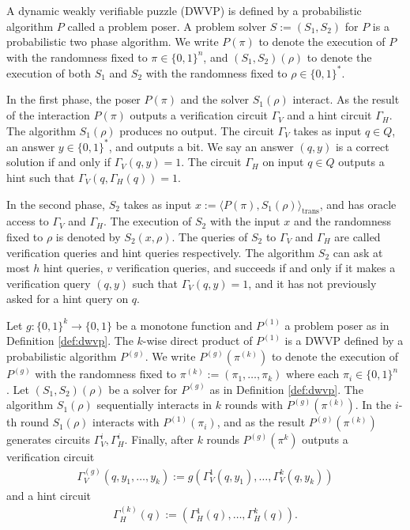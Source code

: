 %
\begin{definition}
  \label{def:dwvp}
  A dynamic weakly verifiable puzzle (DWVP) is defined by a probabilistic algorithm $P$
  called a problem poser.
  A problem solver $S := (S_1, S_2)$ for $P$ is a probabilistic two phase algorithm.
  We write $P(\pi)$ to denote the execution of $P$ with the randomness fixed to $\pi \in \{0,1\}^n$, and $(S_1,S_2)(\rho)$
  to denote the execution of both $S_1$ and $S_2$ with the randomness fixed to $\rho \in \{0,1\}^{*}$.

  In the first phase, the poser $P(\pi)$ and the solver $S_1(\rho)$ interact.
  As the result of the interaction $P(\pi)$ outputs a verification circuit $\Gamma_{V}$ and a hint circuit $\Gamma_{H}$.
  The algorithm $S_1(\rho)$ produces no output.
  The circuit $\Gamma_{V}$ takes as input $q \in Q$, an answer $y \in \{0,1\}^*$,
  and outputs a bit. We say an answer $(q,y)$ is a correct solution if and only if $\Gamma_V(q,y) = 1$.
  The circuit $\Gamma_H$ on input $q \in Q$ outputs a hint such that $\Gamma_V(q,\Gamma_H(q)) = 1$.

  In the second phase, $S_2$ takes as input $x := \langle P(\pi), S_1(\rho) \rangle_{\text{trans}}$,
  and has oracle access to $\Gamma_V$ and $\Gamma_H$.
  The execution of $S_2$ with the input $x$ and the randomness fixed to $\rho$
  is denoted by $S_2(x, \rho)$. The queries of $S_2$ to $\Gamma_V$ and $\Gamma_H$ are called verification queries and hint queries respectively.
  The algorithm $S_2$ can ask at most $h$ hint queries, $v$ verification queries, and succeeds if and only if
  it makes a verification query $(q,y)$ such that $\Gamma_V(q,y) = 1$, and it has not previously asked for a hint query on $q$.
\end{definition}
%
\begin{definition}
  Let $g: \{0,1\}^{k} \rightarrow \{0,1\}$ be a monotone function and $P^{(1)}$ a problem poser as in Definition \ref{def:dwvp}.
  The $k$-wise direct product of $P^{(1)}$ is a DWVP defined by a probabilistic algorithm $P^{(g)}$.
  We write $P^{(g)}(\pi^{(k)})$ to denote the execution of $P^{(g)}$ with the randomness fixed to $\pi^{(k)} := (\pi_1, \dots, \pi_k)$ where each $\pi_i \in \{0,1\}^n$ .
  Let $(S_1, S_2)(\rho)$ be a solver for $P^{(g)}$ as in Definition \ref{def:dwvp}.
  The algorithm $S_1(\rho)$ sequentially interacts in $k$ rounds with $P^{(g)}(\pi^{(k)})$.
  In the $i$-th round $S_1(\rho)$ interacts with $P^{(1)}(\pi_i)$,
  and as the result $P^{(g)}(\pi^{(k)})$ generates circuits $\Gamma_V^i, \Gamma_H^i$.
  Finally, after $k$ rounds $P^{(g)}(\pi^k)$ outputs a verification circuit
\begin{align*}
  \Gamma_V^{(g)} (q, y_1, \dots, y_k) := g(\Gamma_V^{1}(q, y_1), \dots, \Gamma_V^{k}(q, y_k))
\end{align*}
and a hint circuit
\begin{align*}
  \Gamma_H^{(k)} (q) := (\Gamma_H^{1}(q), \dots, \Gamma_H^{k}(q)).
\end{align*}
\end{definition}


